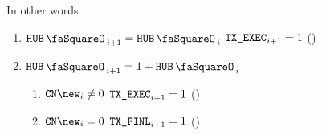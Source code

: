 In other words
\begin{enumerate}
        \item \If $\hubStamp _{i + 1} =     \hubStamp _{i}$ \Then $\texttt{TX}\texttt{\_EXEC} _{i + 1} = 1$ \quad (\trash)
        \item \If $\hubStamp _{i + 1} = 1 + \hubStamp _{i}$ \Then
                \begin{enumerate}
                        \item \If $\cn\new _{i} \neq 0$ \Then $\texttt{TX}\texttt{\_EXEC} _{i + 1} = 1$ \quad (\trash)
                        \item \If $\cn\new _{i} =    0$ \Then $\texttt{TX}\texttt{\_FINL} _{i + 1} = 1$ \quad (\trash)
                \end{enumerate}
\end{enumerate}
